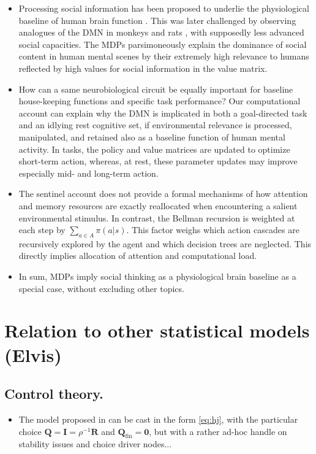 \documentclass{article} %
\newcommand{\R}{\mathbb{R}}
\def\R{\mathbf{R}}
\def\Q{\mathbf{Q}}
\begin{document}
 \begin{itemize}
    \item Processing social information has been proposed to underlie the
    physiological baseline of human brain function
    \citep{schilbach2008minds}. This was later challenged by observing
    analogues of the DMN in monkeys \citep{mantini2011default}
    and rats \citep{lu2012rat}, with
    supposedly less advanced social capacities.
    The MDPs parsimoneously explain the dominance of social content in
    human mental scenes by their extremely high relevance to humans
    reflected by high values for social information in the value matrix.
    \item How can a same neurobiological circuit be equally important
    for baseline house-keeping functions and specific task performance?
    Our computational account can explain why the DMN is implicated
    in both a goal-directed task and an idlying rest cognitive set,
    if environmental relevance is processed, manipulated, and retained
    also as a baseline function of human mental activity.
    In tasks, the policy and value matrices are updated to optimize short-term action,
    whereas, at rest, these parameter updates may
    improve especially mid- and long-term action.
    \item The sentinel account does not provide a formal mechanisms of
    how attention and memory resources are exactly reallocated when
    encountering a salient environmental stimulus. In contrast,
    the Bellman recursion is weighted at each step by
    $\sum_{a \in A}\pi(a|s)$. This factor weighs which action cascades
    are recursively explored by the agent and which decision trees are neglected.
    This directly implies allocation of attention and computational load.
    \item In sum,
    MDPs imply social thinking as a physiological brain baseline
    as a special case, without excluding other topics.
 \end{itemize}



\section{Relation to other statistical models (Elvis)}
\subsection{Control theory.}
\begin{itemize}
  \item The model proposed in \citep{betzel2016} can be cast in the form \eqref{eq:hj}, with the particular choice $\Q = \textbf{I} = \rho^{-1}\R$ and $\Q_{\text{fin}} = \textbf{0}$, but with a rather ad-hoc handle on stability issues and choice driver nodes...
\end{itemize}
\end{document}
